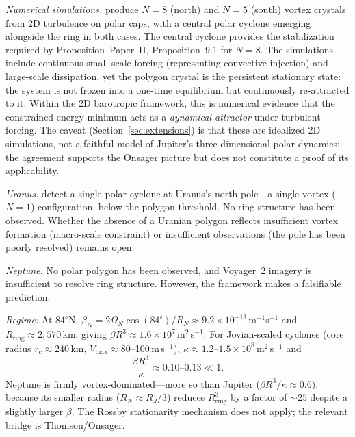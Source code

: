 \emph{Numerical simulations.}  \citet{Siegelman2022} produce $N = 8$
(north) and $N = 5$ (south) vortex crystals from 2D turbulence on polar
caps, with a central polar cyclone emerging alongside the ring in both
cases.  The central cyclone provides the stabilization required by
Proposition~Paper~II, Proposition~9.1 for $N = 8$.
The \citet{Siegelman2022} simulations include continuous small-scale
forcing (representing convective injection) and large-scale dissipation,
yet the polygon crystal is the persistent stationary state: the system
is not frozen into a one-time equilibrium but continuously re-attracted
to it.  Within the 2D barotropic framework, this is numerical evidence
that the constrained energy minimum acts as a \emph{dynamical attractor}
under turbulent forcing.  The caveat (Section~\ref{sec:extensions}) is
that these are idealized 2D simulations, not a faithful model of
Jupiter's three-dimensional polar dynamics; the agreement supports the
Onsager picture but does not constitute a proof of its applicability.

\emph{Uranus.}  \citet{Akins2023} detect a single polar cyclone at
Uranus's north pole---a single-vortex ($N = 1$) configuration, below
the polygon threshold.  No ring structure has been observed.  Whether
the absence of a Uranian polygon reflects insufficient vortex formation
(macro-scale constraint) or insufficient observations (the pole has been
poorly resolved) remains open.

\emph{Neptune.}  No polar polygon has been observed, and Voyager~2
imagery is insufficient to resolve ring structure.  However, the
framework makes a falsifiable prediction.

\textit{Regime:}
At $84^\circ$N, $\beta_N = 2\Omega_N\cos(84^\circ)/R_N \approx
9.2\times10^{-13}$\,m$^{-1}$s$^{-1}$ and $R_{\mathrm{ring}} \approx
2{,}570$\,km, giving $\beta R^3 \approx 1.6\times10^7$\,m$^2$\,s$^{-1}$.
For Jovian-scaled cyclones (core radius $r_c \approx 240$\,km,
$V_{\max}\approx 80$--100\,m\,s$^{-1}$), $\kappa \approx
1.2\text{--}1.5\times10^8$\,m$^2$\,s$^{-1}$ and
\[
  \frac{\beta R^3}{\kappa}\approx 0.10\text{--}0.13 \ll 1.
\]
Neptune is firmly vortex-dominated---more so than Jupiter ($\beta
R^3/\kappa \approx 0.6$), because its smaller radius ($R_N \approx
R_J/3$) reduces $R_{\mathrm{ring}}^3$ by a factor of $\sim\!25$
despite a slightly larger $\beta$.  The Rossby stationarity mechanism
does not apply; the relevant bridge is Thomson/Onsager.

